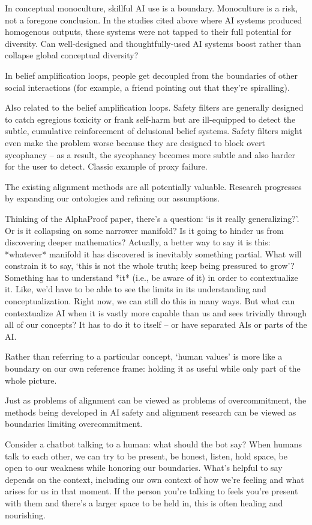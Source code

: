 In conceptual monoculture, skillful AI use is a boundary. Monoculture is a risk, not a foregone conclusion. In the studies cited above where AI systems produced homogenous outputs, these systems were not tapped to their full potential for diversity. Can well-designed and thoughtfully-used AI systems boost rather than collapse global conceptual diversity?

In belief amplification loops, people get decoupled from the boundaries of other social interactions (for example, a friend pointing out that they're spiralling).

Also related to the belief amplification loops. Safety filters are generally designed to catch egregious toxicity or frank self-harm but are ill-equipped to detect the subtle, cumulative reinforcement of delusional belief systems. Safety filters might even make the problem worse because they are designed to block overt sycophancy -- as a result, the sycophancy becomes more subtle and also harder for the user to detect. Classic example of proxy failure.

The existing alignment methods are all potentially valuable. Research progresses by expanding our ontologies and refining our assumptions. 

Thinking of the AlphaProof paper, there's a question: `is it really generalizing?'. Or is it collapsing on some narrower manifold? Is it going to hinder us from discovering deeper mathematics? Actually, a better way to say it is this: *whatever* manifold it has discovered is inevitably something partial. What will constrain it to say, `this is not the whole truth; keep being pressured to grow'? Something has to understand *it* (i.e., be aware of it) in order to contextualize it. Like, we'd have to be able to see the limits in its understanding and conceptualization. Right now, we can still do this in many ways. But what can contextualize AI when it is vastly more capable than us and sees trivially through all of our concepts? It has to do it to itself -- or have separated AIs or parts of the AI.

Rather than referring to a particular concept, `human values' is more like a boundary on our own reference frame: holding it as useful while only part of the whole picture.

Just as problems of alignment can be viewed as problems of overcommitment, the methods being developed in AI safety and alignment research can be viewed as boundaries limiting overcommitment. 

Consider a chatbot talking to a human: what should the bot say? When humans talk to each other, we can try to be present, be honest, listen, hold space, be open to our weakness while honoring our boundaries. What's helpful to say depends on the context, including our own context of how we're feeling and what arises for us in that moment. If the person you're talking to feels you're present with them and there's a larger space to be held in, this is often healing and nourishing. 

